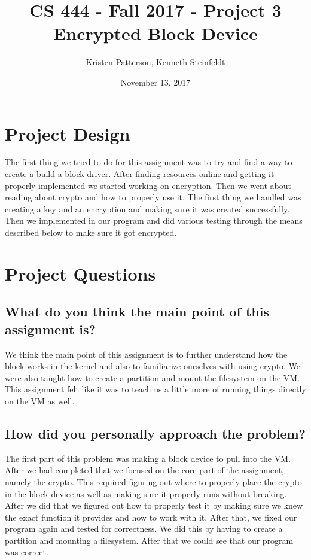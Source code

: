 \documentclass[10pt,letterpaper,onecolumn,draftclsnofoot]{IEEEtran}
\begin{document}
\begin{titlepage}

	\title{CS 444 - Fall 2017 - Project 3 \\ Encrypted Block Device}
	\author{Kristen Patterson, Kenneth Steinfeldt}
	\date{November 13, 2017}
	\maketitle
\end{titlepage}

\section{Project Design}
The first thing we tried to do for this assignment was to try and find a way to create a build a block driver. After finding resources online and getting it properly implemented we started working on encryption. Then we went about reading about crypto and how to properly use it. The first thing we handled was creating a key and an encryption and making sure it was created successfully. Then we implemented in our program and did various testing through the means described below to make sure it got encrypted.

\section{Project Questions}
\subsection{What do you think the main point of this assignment is?}
We think the main point of this assignment is to further understand how the block works in the kernel and also to familiarize ourselves with using crypto. We were also taught how to create a partition and mount the filesystem on the VM. This assignment felt like it was to teach us a little more of running things directly on the VM as well.

\subsection{How did you personally approach the problem?}
The first part of this problem was making a block device to pull into the VM. After we had completed that we focused on the core part of the assignment, namely the crypto. This required figuring out where to properly place the crypto in the block device as well as making sure it properly runs without breaking. After we did that we figured out how to properly test it by making sure we knew the exact function it provides and how to work with it. After that, we fixed our program again and tested for correctness. We did this by having to create a partition and mounting a filesystem. After that we could see that our program was correct.
\end{document}
